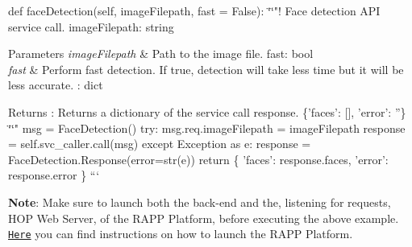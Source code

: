 def face\-Detection(self, image\-Filepath, fast = False)\-: \char`\"{}\char`\"{}"! Face detection A\-P\-I service call.  image\-Filepath\-: string 
\begin{DoxyParams}{Parameters}
{\em image\-Filepath} & Path to the image file.  fast\-: bool \\
\hline
{\em fast} & Perform fast detection. If true, detection will take less time but it will be less accurate. \-: dict \\
\hline
\end{DoxyParams}
\begin{DoxyReturn}{Returns}
\-: Returns a dictionary of the service call response. \{'faces'\-: \mbox{[}\mbox{]}, 'error'\-: ''\} \char`\"{}\char`\"{}" msg = Face\-Detection() try\-: msg.\-req.\-image\-Filepath = image\-Filepath response = self.\-svc\-\_\-caller.\-call(msg) except Exception as e\-: response = Face\-Detection.\-Response(error=str(e)) return \{ 'faces'\-: response.\-faces, 'error'\-: response.\-error \} ```
\end{DoxyReturn}
{\bfseries Note}\-: Make sure to launch both the back-\/end and the, listening for requests, H\-O\-P Web Server, of the R\-A\-P\-P Platform, before executing the above example. \href{https://github.com/rapp-project/rapp-platform/wiki/How-do-I-launch-the-RAPP-Platform%3F}{\tt Here} you can find instructions on how to launch the R\-A\-P\-P Platform. 